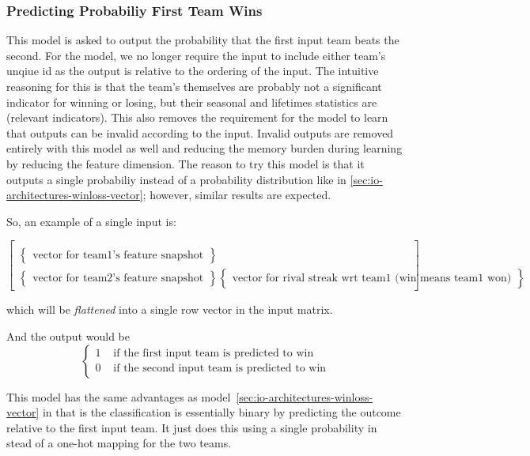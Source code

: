 \documentclass{article} %
\begin{document}
\begin{enumerate}
\subsubsection{Predicting Probabiliy First Team Wins}
\label{sec:io-architectures-first-team-probability}

This model is asked to output the probability that the first input team beats the second. For the model, we no longer require the input to include either team's unqiue id as the output is relative to the ordering of the input.  The intuitive reasoning for this is that the team's themselves are probably not a significant indicator for winning or losing, but their seasonal and lifetimes statistics are (relevant indicators).  This also removes the requirement for the model to learn that outputs can be invalid according to the input.  Invalid outputs are removed entirely with this model as well and reducing the memory burden during learning by reducing the feature dimension.  The reason to try this model is that it outputs a single probabiliy instead of a probability distribution like in \ref{sec:io-architectures-winloss-vector}; however, similar results are expected.

So, an example of a single input is:

\[
\begin{bmatrix}
  \\
  \begin{Bmatrix}
    \text{vector for team1's feature snapshot}
  \end{Bmatrix}
  \\
  \begin{Bmatrix}
    \text{vector for team2's feature snapshot}
  \end{Bmatrix}
  \begin{Bmatrix}
    \text{vector for rival streak wrt team1 (win means team1 won)}
  \end{Bmatrix}
\end{bmatrix}
\]

which will be \textit{flattened} into a single row vector in the input matrix.

And the output would be
\[
\begin{cases}
  1 & \text{ if the first input team is predicted to win}
  \\
  0 & \text{ if the second input team is predicted to win}
\end{cases}
\]


This model has the same advantages as model~\ref{sec:io-architectures-winloss-vector} in that is the classification is essentially binary by predicting the outcome relative to the first input team.  It just does this using a single probability in stead of a one-hot mapping for the two teams.  




\end{enumerate}
\end{document}
